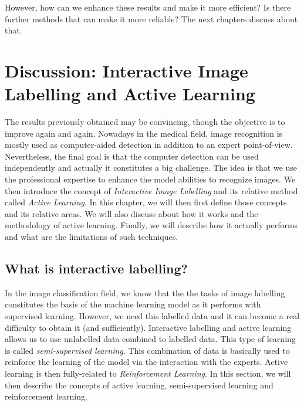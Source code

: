 \documentclass[11pt, openany]{report}
\theoremstyle{plain}
\theoremstyle{definition}
\theoremstyle{remark}
\begin{document}
However, how can we enhance these results and make it more efficient? Is there further methods that can make it more reliable? The next chapters discuss about that. 


\chapter{Discussion: Interactive Image Labelling and Active Learning} \label{chap:active}


The results previously obtained may be convincing, though the objective is to improve again and again. Nowadays in the medical field, image recognition is mostly used as computer-aided detection in addition to an expert point-of-view. Nevertheless, the final goal is that the computer detection can be used independently and actually it constitutes a big challenge. The idea is that we use the professional expertise to enhance the model abilities to recognize images. We then introduce the concept of \textit{Interactive Image Labelling} and its relative method called \textit{Active Learning}. In this chapter, we will then first define those concepts and its relative areas. We will also discuss about how it works and the methodology of active learning. Finally, we will describe how it actually performs and what are the limitations of such techniques. 


\section{What is interactive labelling?}

In the image classification field, we know that the the tasks of image labelling constitutes the basis of the machine learning model as it performs with supervised learning. However, we need this labelled data and it can become a real difficulty to obtain it (and sufficiently). Interactive labelling and active learning allows us to use unlabelled data combined to labelled data. This type of learning is called \textit{semi-supervised learning}. This combination of data is basically used to reinforce the learning of the model via the interaction with the experts. Active learning is then fully-related to \textit{Reinforcement Learning}. In this section, we will then describe the concepts of active learning, semi-supervised learning and reinforcement learning.   
\end{document}
